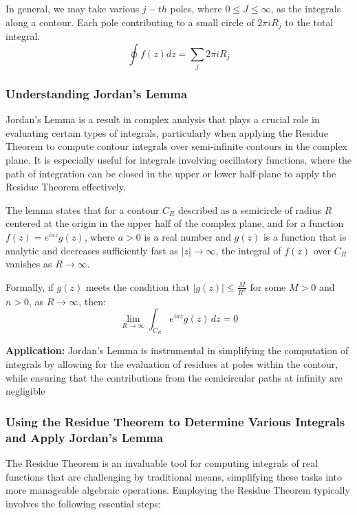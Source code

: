 \documentclass[12pt]{article}
\begin{document}
In general, we may take various $j-th$ poles, where $0\leq J \leq \infty$, as the integrals along a contour. Each pole contributing to a small circle of $2\pi i R_{j}$ to the total integral.
\begin{equation}
    \oint f(z)dz = \sum_{j} 2\pi i R_{j}
\end{equation}


\subsubsection{Understanding Jordan's Lemma}
Jordan's Lemma is a result in complex analysis that plays a crucial role in evaluating certain types of integrals, particularly when applying the Residue Theorem to compute contour integrals over semi-infinite contours in the complex plane. It is especially useful for integrals involving oscillatory functions, where the path of integration can be closed in the upper or lower half-plane to apply the Residue Theorem effectively.

The lemma states that for a contour \(C_R\) described as a semicircle of radius \(R\) centered at the origin in the upper half of the complex plane, and for a function \(f(z) = e^{iaz}g(z)\), where \(a > 0\) is a real number and \(g(z)\) is a function that is analytic and decreases sufficiently fast as \(|z| \rightarrow \infty\), the integral of \(f(z)\) over \(C_R\) vanishes as \(R \rightarrow \infty\).

Formally, if \(g(z)\) meets the condition that \(|g(z)| \leq \frac{M}{R^n}\) for some \(M > 0\) and \(n > 0\), as \(R \rightarrow \infty\), then:
\[
\lim_{R \rightarrow \infty} \int_{C_R} e^{iaz}g(z) \, dz = 0
\]

\textbf{Application:}
Jordan's Lemma is instrumental in simplifying the computation of integrals by allowing for the evaluation of residues at poles within the contour, while ensuring that the contributions from the semicircular paths at infinity are negligible 


\subsubsection{Using the Residue Theorem to Determine Various Integrals and Apply Jordan's Lemma}
The Residue Theorem is an invaluable tool for computing integrals of real functions that are challenging by traditional means, simplifying these tasks into more manageable algebraic operations. Employing the Residue Theorem typically involves the following essential steps:
\end{document}
